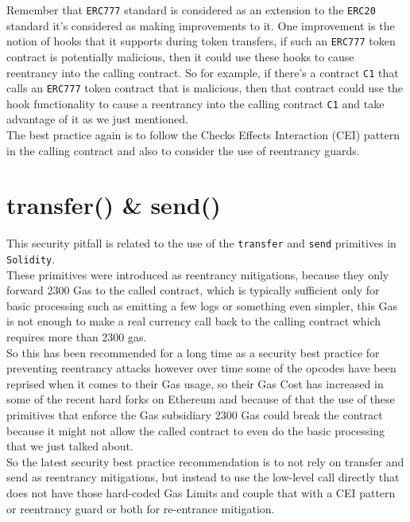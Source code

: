 Remember that \texttt{ERC777} standard is considered as an extension to the \texttt{ERC20} standard it's considered as making improvements to it. One improvement is the notion of hooks that it supports during token transfers, if such an \texttt{ERC777} token contract is potentially malicious, then it could use these hooks to cause reentrancy into the calling contract. So for example, if there's a contract \texttt{C1} that calls an \texttt{ERC777} token contract that is malicious, then that contract could use the hook functionality to cause a reentrancy into the calling contract \texttt{C1} and take advantage of it as we just mentioned.\\

The best practice again is to follow the Checks Effects Interaction (CEI) pattern in the calling contract and also to consider the use of reentrancy guards.

\section{transfer() \& send()}

This security pitfall is related to the use of the \texttt{transfer} and \texttt{send} primitives in \texttt{Solidity}. \\

These primitives were introduced as reentrancy mitigations, because they only forward 2300 Gas to the called contract, which is typically sufficient only for basic processing such as emitting a few logs or something even simpler, this Gas is not enough to make a real currency call back to the calling contract which requires more than 2300 gas.\\ 

So this has been recommended for a long time as a security best practice for preventing reentrancy attacks however over time some of the opcodes have been reprised when it comes to their Gas usage, so their Gas Cost has increased in some of the recent hard forks on Ethereum and because of that the use of these primitives that enforce the Gas subsidiary 2300 Gas could break the contract because it might not allow the called contract to even do the basic processing that we just talked about.\\

So the latest security best practice recommendation is to not rely on transfer and send as reentrancy mitigations, but instead to use the low-level call directly that does not have those hard-coded Gas Limits and couple that with a CEI pattern or reentrancy guard or both for re-entrance mitigation.

